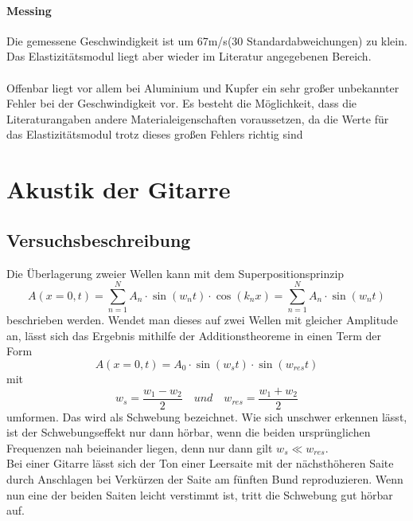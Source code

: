 \documentclass[12pt,a4paper]{article}
\begin{document}
\paragraph{Messing}
Die gemessene Geschwindigkeit ist um 67m/s(30 Standardabweichungen) zu klein.
Das Elastizitätsmodul liegt aber wieder im Literatur angegebenen Bereich.
\\\\
Offenbar liegt vor allem bei Aluminium und Kupfer ein sehr großer unbekannter Fehler bei der Geschwindigkeit vor. Es besteht die Möglichkeit, dass die Literaturangaben andere Materialeigenschaften voraussetzen, da die Werte für das Elastizitätsmodul trotz dieses großen Fehlers richtig sind
\newpage


\section{Akustik der Gitarre}
\subsection{Versuchsbeschreibung}
Die Überlagerung zweier Wellen kann mit dem Superpositionsprinzip
\begin{equation}
A(x = 0, t) = \sum_{n=1}^N A_n \cdot \sin (w_nt) \cdot \cos (k_nx) = \sum_{n=1}^N A_n \cdot \sin (w_nt)
\end{equation}
beschrieben werden. Wendet man dieses auf zwei Wellen mit gleicher Amplitude an, lässt sich das Ergebnis mithilfe der Additionstheoreme in einen Term der Form
\begin{equation}
A(x = 0, t) = A_0 \cdot \sin (w_st) \cdot \sin (w_{res}t)
\end{equation}
mit
\begin{equation}
w_s = \dfrac{w_1 - w_2}{2} \quad und \quad w_{res} = \dfrac{w_1 + w_2}{2}
\label{eq:Schwebungsfrequenz}
\end{equation}
umformen. Das wird als Schwebung bezeichnet. Wie sich unschwer erkennen lässt, ist der Schwebungseffekt nur dann hörbar, wenn die beiden ursprünglichen Frequenzen nah beieinander liegen, denn nur dann gilt $w_s \ll w_{res}$. \\
Bei einer Gitarre lässt sich der Ton einer Leersaite mit der nächsthöheren Saite durch Anschlagen bei Verkürzen der Saite am fünften Bund reproduzieren. Wenn nun eine der beiden Saiten leicht verstimmt ist, tritt die Schwebung gut hörbar auf.
\end{document}
